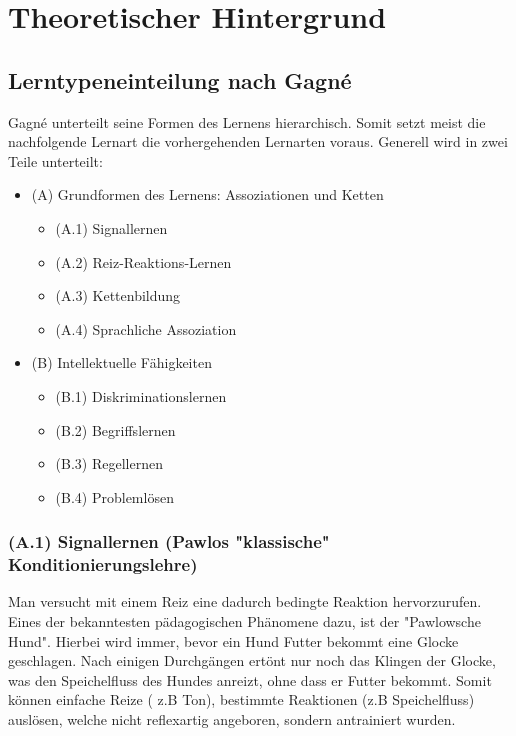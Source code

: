 \chapter{Theoretischer Hintergrund}

\section{Lerntypeneinteilung nach Gagné}

Gagné unterteilt seine Formen des Lernens hierarchisch. Somit setzt meist die nachfolgende Lernart die vorhergehenden Lernarten voraus. Generell wird in zwei Teile unterteilt: 
\begin{itemize}
\item (A) Grundformen des Lernens: Assoziationen und Ketten 
    \begin{itemize}
        \item (A.1) Signallernen
        \item (A.2) Reiz-Reaktions-Lernen
        \item (A.3) Kettenbildung
        \item (A.4) Sprachliche Assoziation
    \end{itemize}
\item (B) Intellektuelle Fähigkeiten
    \begin{itemize}
        \item (B.1) Diskriminationslernen
        \item (B.2) Begriffslernen
        \item (B.3) Regellernen 
        \item (B.4) Problemlösen
    \end{itemize}
\end{itemize}

\subsection[]{(A.1) Signallernen (Pawlos "klassische" Konditionierungslehre)}

Man versucht mit einem Reiz eine dadurch bedingte Reaktion hervorzurufen. Eines der bekanntesten pädagogischen Phänomene dazu, ist der "Pawlowsche Hund". Hierbei wird immer, bevor ein Hund Futter bekommt eine Glocke geschlagen. Nach einigen Durchgängen ertönt nur noch das Klingen der Glocke, was den Speichelfluss des Hundes anreizt, ohne dass er Futter bekommt. Somit können einfache Reize ( z.B Ton), bestimmte Reaktionen (z.B Speichelfluss) auslösen, welche nicht reflexartig angeboren, sondern antrainiert wurden\cite{pawlow1977klassische}.  %

